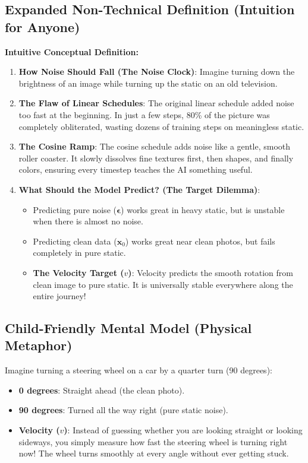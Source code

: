 \documentclass[11pt,a4paper]{article}
\theoremstyle{definition}
\begin{document}
\subsection{Expanded Non-Technical Definition (Intuition for Anyone)}
\textbf{Intuitive Conceptual Definition:}
\begin{enumerate}
    \item \textbf{How Noise Should Fall (The Noise Clock)}: Imagine turning down the brightness of an image while turning up the static on an old television.
    \item \textbf{The Flaw of Linear Schedules}: The original linear schedule added noise too fast at the beginning. In just a few steps, 80\% of the picture was completely obliterated, wasting dozens of training steps on meaningless static.
    \item \textbf{The Cosine Ramp}: The cosine schedule adds noise like a gentle, smooth roller coaster. It slowly dissolves fine textures first, then shapes, and finally colors, ensuring every timestep teaches the AI something useful.
    \item \textbf{What Should the Model Predict? (The Target Dilemma)}:
    \begin{itemize}
        \item Predicting pure noise ($\boldsymbol{\epsilon}$) works great in heavy static, but is unstable when there is almost no noise.
        \item Predicting clean data ($\mathbf{x}_0$) works great near clean photos, but fails completely in pure static.
        \item \textbf{The Velocity Target ($v$)}: Velocity predicts the smooth rotation from clean image to pure static. It is universally stable everywhere along the entire journey!
    \end{itemize}
\end{enumerate}

\subsection{Child-Friendly Mental Model (Physical Metaphor)}
Imagine turning a steering wheel on a car by a quarter turn (90 degrees):
\begin{itemize}
    \item \textbf{0 degrees}: Straight ahead (the clean photo).
    \item \textbf{90 degrees}: Turned all the way right (pure static noise).
    \item \textbf{Velocity ($v$)}: Instead of guessing whether you are looking straight or looking sideways, you simply measure how fast the steering wheel is turning right now! The wheel turns smoothly at every angle without ever getting stuck.
\end{itemize}
\end{document}
